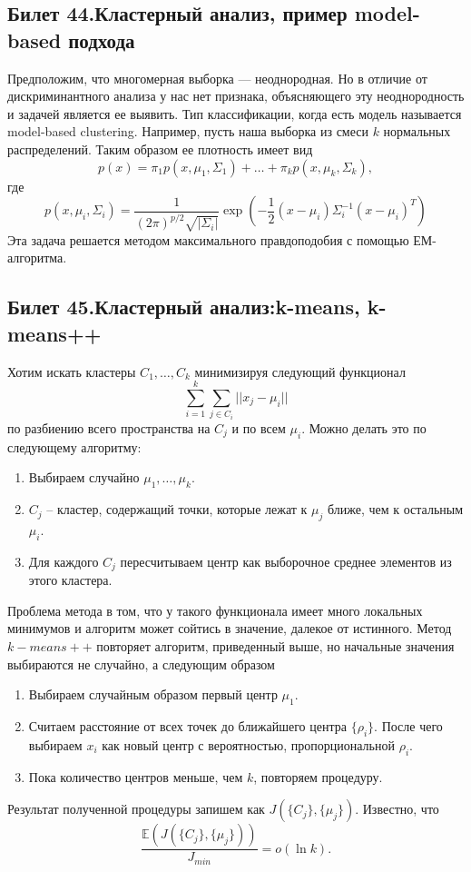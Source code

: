 \subsection{Билет 44.Кластерный	анализ,	пример	model-based	подхода}
Предположим, что многомерная выборка --- неоднородная. Но в отличие от дискриминантного анализа у нас нет признака, объясняющего эту неоднородность и задачей является ее выявить.
Тип классификации, когда есть модель называется model-based clustering.
Например, пусть наша выборка из смеси $k$ нормальных распределений. Таким образом ее плотность имеет вид
\begin{equation}
p(x) = \pi_1 p(x, \mu_1, \Sigma_1) + \ldots + \pi_k p(x, \mu_k, \Sigma_k), 
\end{equation}
где 
\begin{equation}
p(x, \mu_i, \Sigma_i) = \frac{1}{(2\pi)^{p/2}\sqrt{|\Sigma_i|}}
\exp \left(-\frac{1}{2}(x - \mu_i)\Sigma_i^{-1}(x - \mu_i)^T \right)
\end{equation}
Эта задача решается методом максимального правдоподобия с помощью ЕМ-алгоритма.

\subsection{Билет 45.Кластерный	анализ:k-means,	k-means++}
Хотим искать кластеры $C_1, \ldots, C_k$ минимизируя следующий функционал
\begin{equation}
\sum\limits_{i = 1}^k \sum\limits_{j \in C_i} ||x_j - \mu_i||
\label{func_lin}
\end{equation}
по разбиению всего пространства на $C_j$ и по всем $\mu_i$.
Можно делать это по следующему алгоритму:
\begin{enumerate}
\item Выбираем случайно $\mu_1, \ldots, \mu_k$.
\item $C_j$ -- кластер, содержащий точки, которые лежат к $\mu_j$ ближе, чем к остальным $\mu_i$.
\item Для каждого $C_j$ пересчитываем центр как выборочное среднее элементов из этого кластера.
\end{enumerate}
Проблема метода в том, что у такого функционала имеет много локальных минимумов и алгоритм может сойтись в значение, далекое от истинного.
Метод $k-means ++$ повторяет алгоритм, приведенный выше, но начальные значения выбираются не случайно, а следующим образом
\begin{enumerate}
\item Выбираем случайным образом первый центр $\mu_1$.
\item Считаем расстояние от всех точек до ближайшего центра $\{\rho_i\}$. После чего выбираем $x_i$ как новый центр с вероятностью, пропорциональной $\rho_i$.
\item Пока количество центров меньше, чем $k$, повторяем процедуру.
\end{enumerate}
Результат полученной процедуры запишем как $J(\{C_j\}, \{\mu_j\})$.
Известно, что 
\begin{equation*}
\frac{\mathbb{E}(J(\{C_j\}, \{\mu_j\}))}{J_{min}} = o(\ln k ).
\end{equation*}

